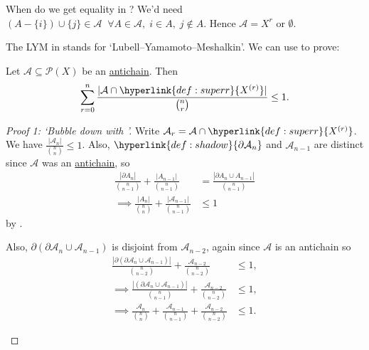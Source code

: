\documentclass{article}
\let\subset\subseteq
\begin{document}
When do we get equality in ? We'd need $(A - \{i\}) \cup \{j\} \in \mathcal{A}\;\;\forall A \in \mathcal{A},\; i \in A,\; j \notin A$. Hence $\mathcal{A} = X^{r}$ or $\emptyset$.

The LYM in  stands for `Lubell–Yamamoto–Meshalkin'.
We can use  to prove:
\begin{nthm}[LYM]\label{thm:lym3}
  Let $\mathcal{A} \subset \mathcal{P}(X)$ be an \hyperlink{def:antichain}{antichain}.
  Then
  \begin{equation*}
    \sum_{r=0}^n \frac{|\mathcal{A} \cap \hyperlink{def:superr}{X^{(r)}}|}{\binom{n}{r}} \leq 1.
  \end{equation*}
\end{nthm}
\begin{proof}[Proof 1: `Bubble down with ']
  Write $\mathcal{A}_r = \mathcal{A} \cap \hyperlink{def:superr}{X^{(r)}}$.
  We have $\frac{|\mathcal{A}_n|}{\binom{n}{n}} \leq 1$.
  Also, $\hyperlink{def:shadow}{\partial \mathcal{A}_n}$ and $\mathcal{A}_{n-1}$ are distinct since $\mathcal{A}$ was an \hyperlink{def:antichain}{antichain}, so
  \begin{align*}
    \frac{|\partial A_n|}{\binom{n}{n-1}} + \frac{|A_{n-1}|}{\binom{n}{n-1}} &= \frac{|\partial A_n \cup A_{n-1}|}{\binom{n}{n-1}} \\
    \implies \frac{|A_n|}{\binom{n}{n}} + \frac{|\mathcal{A}_{n-1}|}{\binom{n}{n-1}} &\leq 1
  \end{align*}
  by .

  Also, $\partial(\partial \mathcal{A}_n \cup \mathcal{A}_{n-1})$ is disjoint from $\mathcal{A}_{n-2}$, again since $\mathcal{A}$ is an antichain so
  \begin{align*}
    \frac{|\partial(\partial \mathcal{A}_n \cup \mathcal{A}_{n-1})|}{\binom{n}{n-2}} + \frac{\mathcal{A}_{n-2}}{{n \choose n-2}} &\leq 1, \\
    \implies \frac{|(\partial \mathcal{A}_n \cup \mathcal{A}_{n-1})|}{\binom{n}{n-1}} + \frac{\mathcal{A}_{n-2}}{{n \choose n-2}} &\leq 1, \\
    \implies \frac{\mathcal{A}_n}{\binom{n}{n}} + \frac{\mathcal{A}_{n-1}}{\binom{n}{n-1}} + \frac{\mathcal{A}_{n-2}}{\binom{n}{n-2}} &\leq 1.
  \end{align*}
  \begin{center}
\end{center}
\end{proof}
\end{document}
